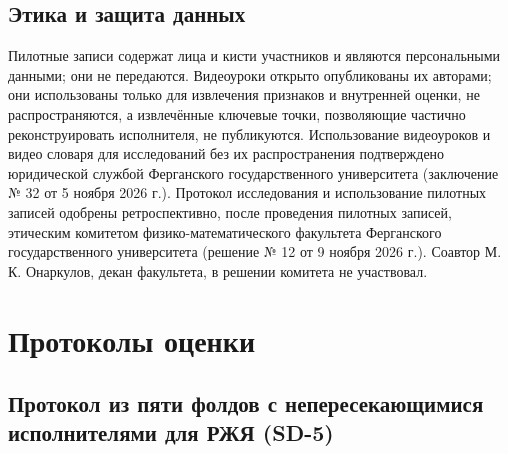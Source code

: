 \documentclass[a4paper,fleqn]{cas-dc}
\begin{document}
\hypertarget{ux44dux442ux438ux43aux430-ux438-ux437ux430ux449ux438ux442ux430-ux434ux430ux43dux43dux44bux445}{%
\subsection{Этика и защита данных}\label{ux44dux442ux438ux43aux430-ux438-ux437ux430ux449ux438ux442ux430-ux434ux430ux43dux43dux44bux445}}

Пилотные записи содержат лица и кисти участников и являются персональными данными; они не передаются. Видеоуроки открыто опубликованы их авторами; они использованы только для извлечения признаков и внутренней оценки, не распространяются, а извлечённые ключевые точки, позволяющие частично реконструировать исполнителя, не публикуются. Использование видеоуроков и видео словаря для исследований без их распространения подтверждено юридической службой Ферганского государственного университета (заключение № 32 от 5 ноября 2026 г.). Протокол исследования и использование пилотных записей одобрены ретроспективно, после проведения пилотных записей, этическим комитетом физико-математического факультета Ферганского государственного университета (решение № 12 от 9 ноября 2026 г.). Соавтор М. К. Онаркулов, декан факультета, в решении комитета не участвовал.

\hypertarget{ux43fux440ux43eux442ux43eux43aux43eux43bux44b-ux43eux446ux435ux43dux43aux438}{%
\section{Протоколы оценки}\label{ux43fux440ux43eux442ux43eux43aux43eux43bux44b-ux43eux446ux435ux43dux43aux438}}

\hypertarget{ux43fux440ux43eux442ux43eux43aux43eux43b-ux438ux437-ux43fux44fux442ux438-ux444ux43eux43bux434ux43eux432-ux441-ux43dux435ux43fux435ux440ux435ux441ux435ux43aux430ux44eux449ux438ux43cux438ux441ux44f-ux438ux441ux43fux43eux43bux43dux438ux442ux435ux43bux44fux43cux438-ux434ux43bux44f-ux440ux436ux44f-sd-5}{%
\subsection{Протокол из пяти фолдов с непересекающимися исполнителями для РЖЯ (SD-5)}\label{ux43fux440ux43eux442ux43eux43aux43eux43b-ux438ux437-ux43fux44fux442ux438-ux444ux43eux43bux434ux43eux432-ux441-ux43dux435ux43fux435ux440ux435ux441ux435ux43aux430ux44eux449ux438ux43cux438ux441ux44f-ux438ux441ux43fux43eux43bux43dux438ux442ux435ux43bux44fux43cux438-ux434ux43bux44f-ux440ux436ux44f-sd-5}}
\end{document}
